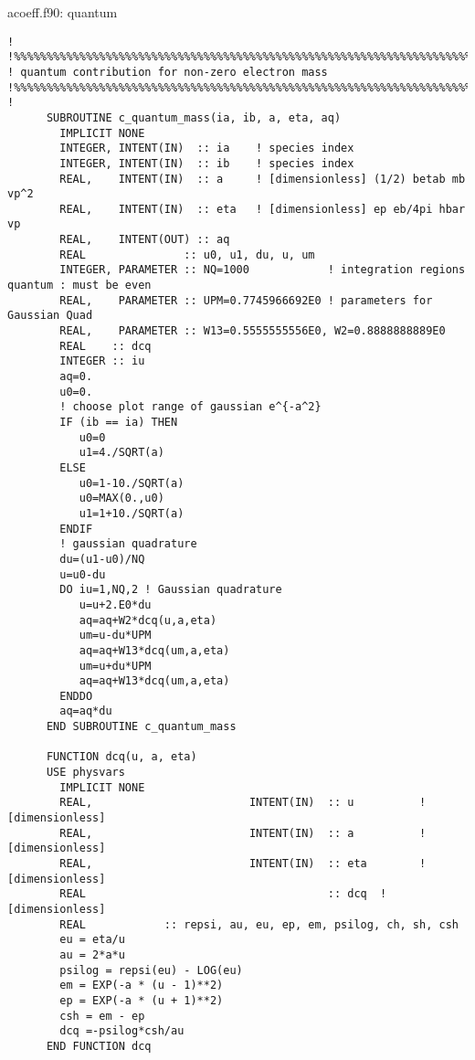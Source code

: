 \documentclass[preprint,12pt,eqsecnum,nofootinbib,amsmath,amssymb]{revtex4}
\begin{document}
{{\vskip1cm 
\noindent
acoeff.f90: quantum
{
\baselineskip 10pt
\begin{verbatim}
!
!%%%%%%%%%%%%%%%%%%%%%%%%%%%%%%%%%%%%%%%%%%%%%%%%%%%%%%%%%%%%%%%%%%%%%%%
! quantum contribution for non-zero electron mass
!%%%%%%%%%%%%%%%%%%%%%%%%%%%%%%%%%%%%%%%%%%%%%%%%%%%%%%%%%%%%%%%%%%%%%%%
!
      SUBROUTINE c_quantum_mass(ia, ib, a, eta, aq)
        IMPLICIT NONE
        INTEGER, INTENT(IN)  :: ia    ! species index
        INTEGER, INTENT(IN)  :: ib    ! species index
        REAL,    INTENT(IN)  :: a     ! [dimensionless] (1/2) betab mb vp^2
        REAL,    INTENT(IN)  :: eta   ! [dimensionless] ep eb/4pi hbar vp
        REAL,    INTENT(OUT) :: aq 
        REAL               :: u0, u1, du, u, um
        INTEGER, PARAMETER :: NQ=1000            ! integration regions quantum : must be even
        REAL,    PARAMETER :: UPM=0.7745966692E0 ! parameters for Gaussian Quad
        REAL,    PARAMETER :: W13=0.5555555556E0, W2=0.8888888889E0
        REAL    :: dcq
        INTEGER :: iu
        aq=0.
        u0=0.
        ! choose plot range of gaussian e^{-a^2}
        IF (ib == ia) THEN
           u0=0
           u1=4./SQRT(a)
        ELSE
           u0=1-10./SQRT(a)
           u0=MAX(0.,u0)  
           u1=1+10./SQRT(a)
        ENDIF
        ! gaussian quadrature
        du=(u1-u0)/NQ
        u=u0-du
        DO iu=1,NQ,2 ! Gaussian quadrature
           u=u+2.E0*du
           aq=aq+W2*dcq(u,a,eta)
           um=u-du*UPM
           aq=aq+W13*dcq(um,a,eta)
           um=u+du*UPM
           aq=aq+W13*dcq(um,a,eta)
        ENDDO
        aq=aq*du
      END SUBROUTINE c_quantum_mass

      FUNCTION dcq(u, a, eta)
      USE physvars
        IMPLICIT NONE
        REAL,                        INTENT(IN)  :: u          ! [dimensionless]
        REAL,                        INTENT(IN)  :: a          ! [dimensionless]
        REAL,                        INTENT(IN)  :: eta        ! [dimensionless]
        REAL                                     :: dcq  ! [dimensionless]
        REAL            :: repsi, au, eu, ep, em, psilog, ch, sh, csh
        eu = eta/u
        au = 2*a*u
        psilog = repsi(eu) - LOG(eu)
        em = EXP(-a * (u - 1)**2)
        ep = EXP(-a * (u + 1)**2)
        csh = em - ep
        dcq =-psilog*csh/au
      END FUNCTION dcq
\end{verbatim}
}






\pagebreak
\appendix



}}
\end{document}
